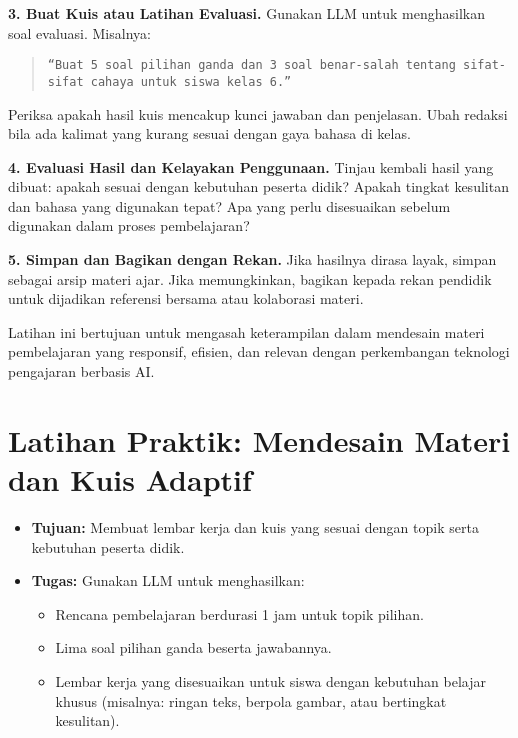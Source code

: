 \textbf{3. Buat Kuis atau Latihan Evaluasi.}  
Gunakan LLM untuk menghasilkan soal evaluasi. Misalnya:
\begin{quote}
	\centering
	\texttt{“Buat 5 soal pilihan ganda dan 3 soal benar-salah tentang sifat-sifat cahaya untuk siswa kelas 6.”}
\end{quote}
Periksa apakah hasil kuis mencakup kunci jawaban dan penjelasan. Ubah redaksi bila ada kalimat yang kurang sesuai dengan gaya bahasa di kelas.

\textbf{4. Evaluasi Hasil dan Kelayakan Penggunaan.}  
Tinjau kembali hasil yang dibuat: apakah sesuai dengan kebutuhan peserta didik? Apakah tingkat kesulitan dan bahasa yang digunakan tepat? Apa yang perlu disesuaikan sebelum digunakan dalam proses pembelajaran?

\textbf{5. Simpan dan Bagikan dengan Rekan.}  
Jika hasilnya dirasa layak, simpan sebagai arsip materi ajar. Jika memungkinkan, bagikan kepada rekan pendidik untuk dijadikan referensi bersama atau kolaborasi materi.

Latihan ini bertujuan untuk mengasah keterampilan dalam mendesain materi pembelajaran yang responsif, efisien, dan relevan dengan perkembangan teknologi pengajaran berbasis AI.


\section*{Latihan Praktik: Mendesain Materi dan Kuis Adaptif}
\begin{itemize}
	\item \textbf{Tujuan:} Membuat lembar kerja dan kuis yang sesuai dengan topik serta kebutuhan peserta didik.
	\item \textbf{Tugas:} Gunakan LLM untuk menghasilkan:
	\begin{itemize}
		\item Rencana pembelajaran berdurasi 1 jam untuk topik pilihan.
		\item Lima soal pilihan ganda beserta jawabannya.
		\item Lembar kerja yang disesuaikan untuk siswa dengan kebutuhan belajar khusus (misalnya: ringan teks, berpola gambar, atau bertingkat kesulitan).
	\end{itemize}
\end{itemize}
